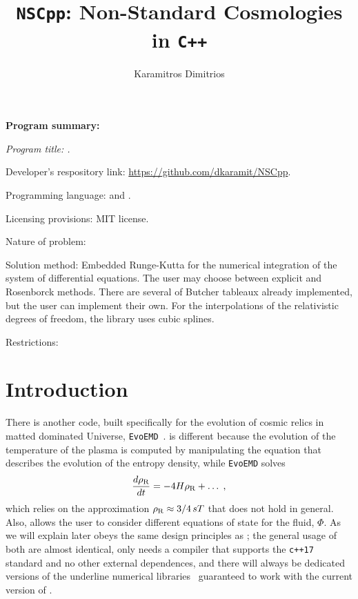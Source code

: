 \documentclass[11pt,a4paper]{article}
\author[ ]{Karamitros Dimitrios}
\affil[ ]{\em School of Physics and Astronomy, The University of Manchester,
	Manchester M13 9PL, United Kingdom}
\affil[ ]{\textit{E-mail: } \href{mailto:dimitrios.karamitros@manchester.ac.uk}{\color{blue}{dimitrios.karamitros@manchester.ac.uk}}}
\title{{\tt NSCpp}: Non-Standard Cosmologies in {\tt C++}}
\begin{document}
\maketitle


\begin{abstract}
\end{abstract}

{\bf Program summary:}

{\sl 
	Program title: \nsc.
	
	Developer's respository link: \href{https://github.com/dkaramit/NSCpp}{https://github.com/dkaramit/NSCpp}.
	
	Programming language: \CPP and \PY.
	
	Licensing provisions: MIT license.
	
	Nature of problem: 
	
	Solution method: Embedded Runge-Kutta for the numerical integration of the system of differential equations. The user may choose between explicit and Rosenborck methods. There are several of Butcher tableaux already implemented, but the user can implement their own. For the interpolations of the relativistic degrees of freedom, the library uses cubic splines. 
	
	Restrictions: 
}

\tableofcontents




\section{Introduction}\label{sec:intro}
\setcounter{equation}{0}

There is another code, built specifically for the evolution of cosmic relics in matted dominated Universe, {\tt EvoEMD}~\cite{Dutra:2021phm}. \nsc is different because the evolution of the temperature of the plasma is computed by manipulating the equation that describes the evolution of the entropy density, while {\tt EvoEMD} solves
%
\begin{equation}
	\dfrac{d\rho_{\rm R}}{dt} = -4H\rho_{\rm R} + \dots \;,
	\label{eq:EvoMD}
\end{equation}
%
which relies on the approximation $\rho_{\rm R} \approx 3/4 \, sT$ that does not hold in general. Also, \nsc allows the user to consider different equations of state for the fluid, $\Phi$. 
%
As we will explain later \nsc obeys the same design principles as \mimes; \ie the general usage of both are almost identical, \nsc only needs a \CPP compiler that supports the {\tt c++17} standard and no other external dependences, and there will always be dedicated versions of the underline numerical libraries~\cite{NaBBODES,SimpleSplines} guaranteed to work with the current version of \nsc.
\end{document}
